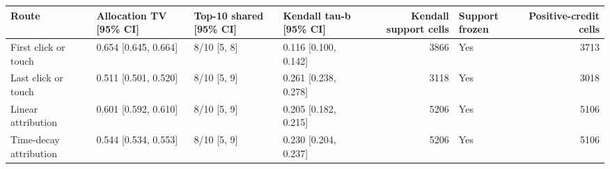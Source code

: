\begin{tabular}{llllrlr}
\toprule
Route & Allocation TV [95\% CI] & Top-10 shared [95\% CI] & Kendall tau-b [95\% CI] & Kendall support cells & Support frozen & Positive-credit cells \\
\midrule
First click or touch & 0.654 [0.645, 0.664] & 8/10 [5, 8] & 0.116 [0.100, 0.142] & 3866 & Yes & 3713 \\
Last click or touch & 0.511 [0.501, 0.520] & 8/10 [5, 9] & 0.261 [0.238, 0.278] & 3118 & Yes & 3018 \\
Linear attribution & 0.601 [0.592, 0.610] & 8/10 [5, 9] & 0.205 [0.182, 0.215] & 5206 & Yes & 5106 \\
Time-decay attribution & 0.544 [0.534, 0.553] & 8/10 [5, 9] & 0.230 [0.204, 0.237] & 5206 & Yes & 5106 \\
\bottomrule
\end{tabular}
